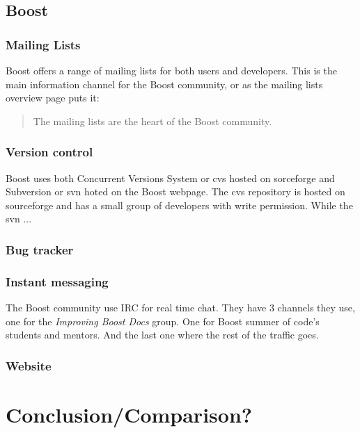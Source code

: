 \documentclass{report} %
\begin{document}
\subsection{Boost}
\subsubsection{Mailing Lists}
Boost offers a range of mailing lists\cite{boostmaillists} for both users and developers. This is the main information channel for the Boost community, or as the mailing lists overview page\cite{boostmaillists} puts it:
\begin{quote}
The mailing lists are the heart of the Boost community.
\end{quote}
\subsubsection{Version control}
Boost uses both Concurrent Versions System or cvs hosted on sorceforge\cite{boostcvssourceforge} and Subversion or svn hoted on the Boost webpage\cite{boostsvn}. The cvs repository is hosted on sourceforge and has a small group of developers with write permission. While the svn ...

\subsubsection{Bug tracker}

\subsubsection{Instant messaging}
The Boost community use IRC for real time chat. They have 3 channels they use, one for the \emph{Improving Boost Docs} group. One for Boost summer of code's students and mentors. And the last one where the rest of the traffic goes.
\subsubsection{Website}

\section{Conclusion/Comparison?}


\end{document}
